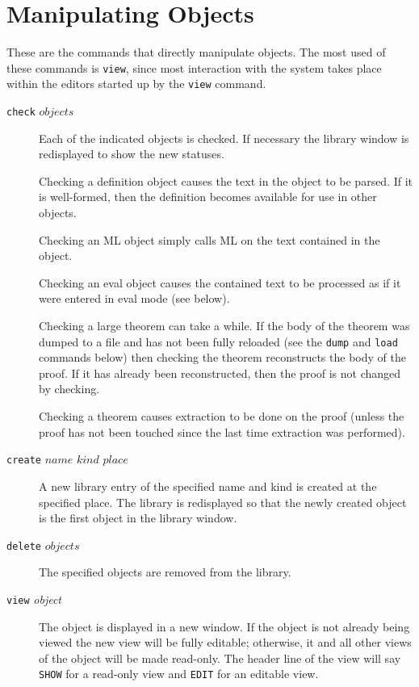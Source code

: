\section{Manipulating Objects}

These are the commands that directly manipulate{}
objects.
The most used of these commands is {\tt view},
since most interaction with the system takes place within the editors
started up by the {\tt view} command.

\begin {description}
\item[{\tt check} $objects$]{} \hfill \break
\noindent {}{}
    Each of the indicated objects is checked.
    If necessary the library window is redisplayed to show the 
    new statuses.

    Checking a definition object causes the text in the object 
    to be parsed.  If it is well-formed, then the definition
    becomes available for use in other objects.

    Checking an ML object simply calls ML on the text contained
    in the object.
 
    Checking an eval object causes the contained text to be
    processed as if it were entered in eval mode (see below).

    Checking a large theorem can take a while.
    If the body of the theorem was dumped to a file and has not been fully
    reloaded (see the {\tt dump} and {\tt load} commands below) then checking
    the theorem reconstructs the body of the proof.
    If it has already been reconstructed, then the proof is not changed by
    checking.

    Checking a theorem causes extraction to be done on the proof (unless
    the proof has not been touched since the last time extraction was
    performed).
    

\item[{\tt create} $name$ $kind$ $place$]{} \hfill \break
\noindent {}
    A new library entry
    of the specified name and kind is created at the specified place.
    The library is redisplayed so that the newly created object is the first
    object in the library window.

\item[{\tt delete} $objects$]{} \hfill \break
\noindent {}
    The specified objects are removed from the library.


\item[{\tt view} {\it object}]{} \hfill \break
\noindent {}
    The object is displayed in a new window.
    If the object is not already being viewed the new view will be fully
    editable; otherwise, it and all other views of the object will be made
    read-only.
    The header line of the view will say {\tt SHOW} for a read-only view
    and {\tt EDIT} for an editable view.


\end{description}
